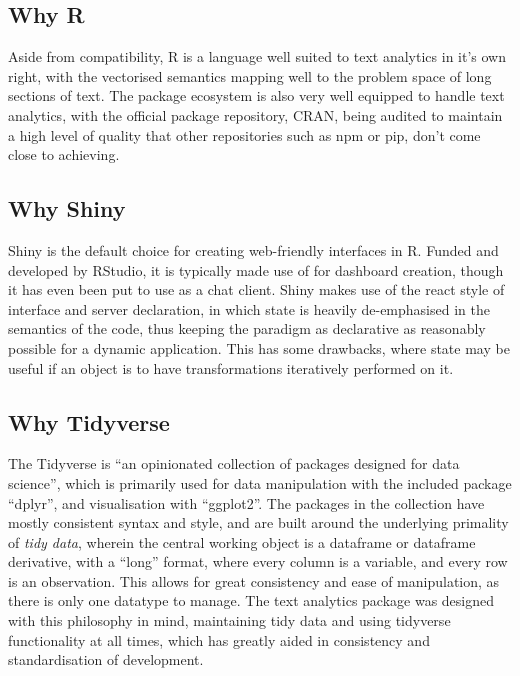 \documentclass[11pt, a4paper, twoside, titlepage]{report}
\begin{document}
\subsection{Why R}

Aside from compatibility, R is a language well suited to text
analytics in it's own right, with the vectorised semantics mapping
well to the problem space of long sections of text. The package
ecosystem is also very well equipped to handle text analytics, with
the official package repository, CRAN, being audited to maintain a
high level of quality that other repositories such as npm or pip,
don't come close to achieving.

\subsection{Why Shiny}

Shiny is the default choice for creating web-friendly interfaces in R.
Funded and developed by RStudio, it is typically made use of for
dashboard creation, though it has even been put to use as a chat
client. Shiny makes use of the react style of interface and server
declaration, in which state is heavily de-emphasised in the semantics
of the code, thus keeping the paradigm as declarative as reasonably
possible for a dynamic application. This has some drawbacks, where
state may be useful if an object is to have transformations
iteratively performed on it.

\subsection{Why Tidyverse}\label{sec:why-tidyverse}

The Tidyverse is ``an opinionated collection of packages designed for
data science'', which is primarily used for data manipulation with the
included package ``dplyr''\autocite{wickham19dpl}, and visualisation
with ``ggplot2''. The packages in the collection have mostly
consistent syntax and style, and are built around the underlying
primality of \textit{tidy data}, wherein the central working object is
a dataframe or dataframe derivative, with a ``long'' format, where
every column is a variable, and every row is an
observation\autocite{wickham2014tidy}. This allows for great
consistency and ease of manipulation, as there is only one datatype to
manage. The text analytics package was designed with this philosophy
in mind, maintaining tidy data and using tidyverse functionality at
all times, which has greatly aided in consistency and standardisation
of development.
\end{document}
